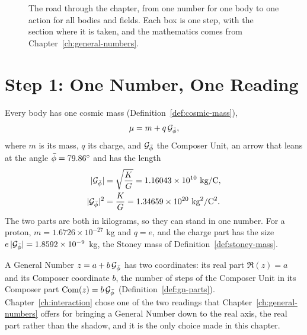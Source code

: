 \begin{figure}[tb]
\caption[The road through the chapter]{The road through the chapter, from one number for one body to one action for all bodies and fields. Each box is one step, with the section where it is taken, and the mathematics comes from Chapter~\ref{ch:general-numbers}.}
\label{fig:un-map}
\end{figure}

\section{Step 1: One Number, One Reading}\label{sec:un-reading}

Every body has one cosmic mass (Definition~\ref{def:cosmic-mass}),
\[
\mu = m + q\,\mathcal{G}_{\bar{\phi}} ,
\]
where $m$ is its mass, $q$ its charge, and $\mathcal{G}_{\bar{\phi}}$ the Composer Unit, an arrow that leans at the angle $\bar{\phi} = 79.86^\circ$ and has the length
\begin{align*}
|\Gp| &= \sqrt{\frac{K}{G}} = 1.16043 \times 10^{10}\ \text{kg/C},\\
|\Gp|^2 &= \frac{K}{G} = 1.34659 \times 10^{20}\ \text{kg}^2/\text{C}^2 .
\end{align*}
The two parts are both in kilograms, so they can stand in one number. For a proton, $m = 1.6726 \times 10^{-27}$ kg and $q = e$, and the charge part has the size $e\,|\mathcal{G}_{\bar{\phi}}| = 1.8592 \times 10^{-9}$ kg, the Stoney mass of Definition~\ref{def:stoney-mass}.

A General Number $z = a + b\,\mathcal{G}_{\bar{\phi}}$ has two coordinates: its real part $\Re(z) = a$ and its Composer coordinate $b$, the number of steps of the Composer Unit in its Composer part $\operatorname{Com}(z) = b\,\mathcal{G}_{\bar{\phi}}$ (Definition~\ref{def:gn-parts}). Chapter~\ref{ch:interaction} chose one of the two readings that Chapter~\ref{ch:general-numbers} offers for bringing a General Number down to the real axis, the real part rather than the shadow, and it is the only choice made in this chapter.

